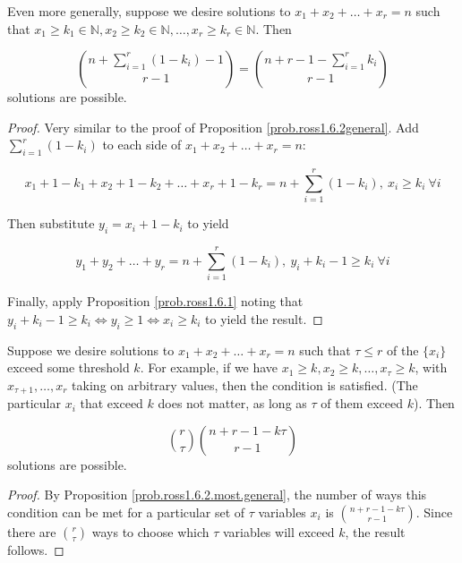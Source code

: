 \begin{proposition}\label{prob.ross1.6.2.most.general} Even more generally, suppose we desire solutions to \(x_1 + x_2 + \ldots + x_r = n\) such that  \(x_1 \geq k_1 \in \mathbb{N}, x_2 \geq k_2 \in \mathbb{N}, \ldots, x_r \geq k_r \in \mathbb{N}\). Then 

\[
\binom{n +  \sum_{i=1}^r (1 - k_i )-1}{r-1} = \binom{n + r - 1 -  \sum_{i=1}^r  k_i}{r-1}
\] solutions are possible.

\begin{proof}
Very similar to the proof of Proposition \ref{prob.ross1.6.2general}. Add \(\sum_{i=1}^r (1 - k_i ) \) to each side of \(x_1 + x_2 + \ldots + x_r = n\):

\[
x_1 + 1 - k_1 + x_2 + 1 - k_2 + \ldots + x_r  + 1 - k_r = n + \sum_{i=1}^r (1 - k_i ), \ x_i \geq k_i \ \forall i
\]

Then substitute \(y_i = x_i + 1 - k_i\) to yield 

\[
y_1+ y_2 + \ldots + y_ r = n +  \sum_{i=1}^r (1 - k_i ), \ y_i + k_i - 1\geq k_i \ \forall i
\]

Finally, apply Proposition \ref{prob.ross1.6.1} noting that \(y_i + k_i - 1\geq k_i \iff y_i \geq 1 \iff x_i \geq k_i\) to yield the result.
\end{proof}

\end{proposition}

\begin{proposition}\label{prob.ross1.6.2.numer} Suppose we desire solutions to \(x_1 + x_2 + \ldots + x_r = n\) such that \(\tau \leq r\) of the \(\{x_i\}\) exceed some threshold \(k\). For example, if we have \(x_1 \geq k, x_2 \geq k, \ldots, x_\tau \geq k\), with \(x_{\tau + 1}, \ldots, x_r\) taking on arbitrary values, then the condition is satisfied. (The particular \(x_i\) that exceed \(k\) does not matter, as long as \(\tau\) of them exceed \(k\)). Then

\[
\binom{r}{\tau}\binom{n + r - 1 - k \tau}{r-1}
\] solutions are possible.

\begin{proof}
By Proposition \ref{prob.ross1.6.2.most.general}, the number of ways this condition can be met for a particular set of \(\tau\) variables \(x_i\) is \(\binom{n + r - 1 - k \tau}{r-1}\). Since there are \(\binom{r}{\tau}\) ways to choose which \(\tau\) variables will exceed \(k\), the result follows.
\end{proof}

\end{proposition}

